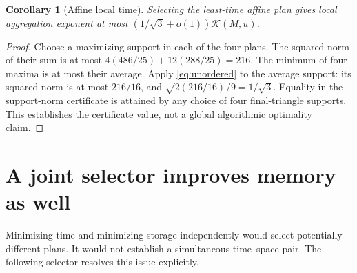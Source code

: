 \documentclass[11pt]{article}
\newtheorem{corollary}[theorem]{Corollary}
\theoremstyle{definition}\newtheorem{definition}[theorem]{Definition}
\theoremstyle{remark}\newtheorem{remark}[theorem]{Remark}
\newcommand{\K}{\mathcal K}
\begin{document}
\begin{corollary}[Affine local time]\label{cor:affinetime}
Selecting the least-time affine plan gives local aggregation exponent
at most $(1/\sqrt3+o(1))\K(M,u)$.
\end{corollary}
\begin{proof}
Choose a maximizing support in each of the four plans. The squared norm
of their sum is at most
$4(486/25)+12(288/25)=216$.
The minimum of four maxima is at most their average. Apply
\eqref{eq:unordered} to the average support: its squared norm is at most
$216/16$, and $\sqrt{2(216/16)}/9=1/\sqrt3$.
Equality in the support-norm certificate is attained by any choice of four
final-triangle supports. This establishes the certificate value, not a
global algorithmic optimality claim.
\end{proof}

\section{A joint selector improves memory as well}
\label{sec:jointselector}

Minimizing time and minimizing storage independently would select
potentially different plans. It would not establish a simultaneous
time--space pair. The following selector resolves this issue explicitly.
\end{document}

